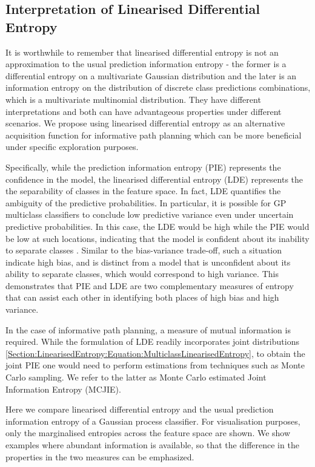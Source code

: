 \documentclass{article}
\begin{document}
	\subsection{Interpretation of Linearised Differential Entropy}
	
		It is worthwhile to remember that linearised differential entropy is not an approximation to the usual prediction information entropy - the former is a differential entropy on a multivariate Gaussian distribution and the later is an information entropy on the distribution of discrete class predictions combinations, which is a multivariate multinomial distribution. They have different interpretations and both can have advantageous properties under different scenarios. We propose using linearised differential entropy as an alternative acquisition function for informative path planning which can be more beneficial under specific exploration purposes.
		
		Specifically, while the prediction information entropy (PIE) represents the confidence in the model, the linearised differential entropy (LDE) represents the the separability of classes in the feature space. In fact, LDE quantifies the ambiguity of the predictive probabilities. In particular, it is possible for GP multiclass classifiers to conclude low predictive variance even under uncertain predictive probabilities. In this case, the LDE would be high while the PIE would be low at such locations, indicating that the model is confident about its inability to separate classes \cite{AsherBender}. Similar to the bias-variance trade-off, such a situation indicate high bias, and is distinct from a model that is unconfident about its ability to separate classes, which would correspond to high variance. This demonstrates that PIE and LDE are two complementary measures of entropy that can assist each other in identifying both places of high bias and high variance.
		
		In the case of informative path planning, a measure of mutual information is required. While the formulation of LDE readily incorporates joint distributions \eqref{Section:LinearisedEntropy:Equation:MulticlassLinearisedEntropy}, to obtain the joint PIE one would need to perform estimations from techniques such as Monte Carlo sampling. We refer to the latter as Monte Carlo estimated Joint Information Entropy (MCJIE).
		
		Here we compare linearised differential entropy and the usual prediction information entropy of a Gaussian process classifier. For visualisation purposes, only the marginalised entropies across the feature space are shown. We show examples where abundant information is available, so that the difference in the properties in the two measures can be emphasized. 
		
\end{document}
